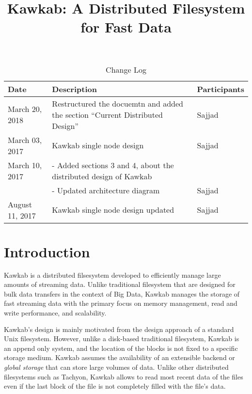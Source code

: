 \documentclass[]{article}
\begin{document}
\title{Kawkab: A Distributed Filesystem for Fast Data}
\date{}
\maketitle

\bgroup
\def\arraystretch{1.5}
\begin{table}[!htb]
\centering
\caption{Change Log}
\label{table:change-log}
\begin{tabular}{|l|l|l|}
\hline
\rowcolor[HTML]{EFEFEF} 
Date             & Description  & Participants  \\ \hline
 March 20, 2018  & Restructured the docuemtn and added the section ``Current Distributed Design'' & Sajjad \\ \hline
 March 03, 2017  & Kawkab single node design           & Sajjad  \\ \hline
 March 10, 2017  & - Added sections 3 and 4, about the distributed design of Kawkab& \\ 
                 & - Updated architecture diagram & Sajjad  \\ \hline
 August 11, 2017  & Kawkab single node design updated  & Sajjad  \\ \hline
\end{tabular}
\end{table}
\egroup


\section{Introduction} 

Kawkab is a distributed filsesystem developed to efficiently manage large
amounts of streaming data. Unlike traditional filesystem that are designed for
bulk data transfers in the context of Big Data, Kawkab manages the storage of
fast streaming data with the primary focus on memory management, read and write
performance, and scalability.


Kawkab's design is mainly motivated from the design approach of a standard Unix
filesystem.  However, unlike a disk-based traditional filesystem, Kawkab is an
append only system,  and the location of the blocks is not fixed to a specific
storage medium. Kawkab assumes the availability of an extensible backend or
\textit{global storage} that can store large volumes of data. Unlike other
distributed filesystems such as Tachyon, Kawkab allows to read most recent data
of the files even if the last block of the file is not completely filled with
the file's data. 
\end{document}
